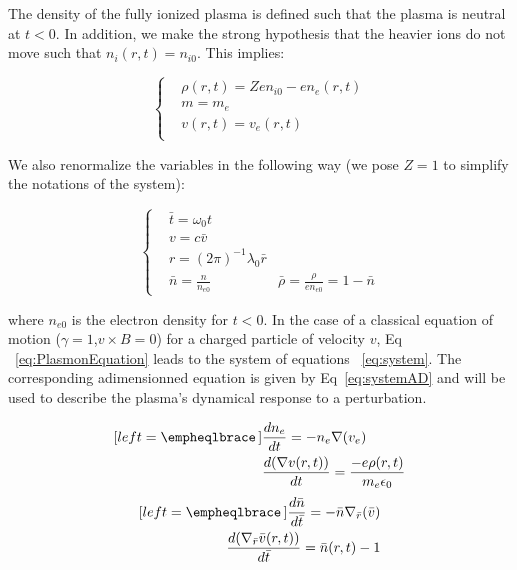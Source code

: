 \noindent The density of the fully ionized plasma is defined such that the plasma is neutral at $t < 0$. In addition, we make the strong hypothesis that the heavier ions do not move such that $n_i(r,t) = n_{i0}$. This implies:


\begin{equation}
  \left\{
      \begin{aligned}
     &\rho(r,t) = Z e n_{i0} - e  n_e(r,t)\\
     &m = m_e\\
    &v(r,t) = v_e(r,t)\\
      \end{aligned}
    \right.
\label{eq:Parameters}
\end{equation}

\noindent We also renormalize the variables in the following way (we pose $Z=1$ to simplify the notations of the system):

\begin{equation}
  \left\{
      \begin{aligned}
     &\bar{t} = \omega_0 t\\
     &v = c \bar{v}\\
     &r = (2\pi)^{-1} \lambda_0 \bar{r}\\  
     & \bar{n} = \frac{n}{n_{e0}} 
     & \bar{\rho} = \frac{\rho}{e n_{e0}} = 1 - \bar{n}
      \end{aligned}
    \right.
\end{equation}

\noindent where $n_{e0}$ is the electron density for $t<0$.
In the case of a classical equation of motion ($\gamma = 1$,$v\times B = 0$) for a charged particle of velocity $v$, Eq ~\ref{eq:PlasmonEquation} leads to the system of equations 
~\ref{eq:system}. The corresponding adimensionned equation is given by Eq~\ref{eq:systemAD} and will be used to describe the plasma's dynamical response to a perturbation.



\begin{multicols}{2}

\begin{subequations}
\label{eq:system}
\begin{align}[left = \empheqlbrace\,]
  &\frac{d n_e}{dt} = - n_e\nabla(v_e)  \label{eq:system1}\\
  &\frac{d( \nabla v(r,t))}{dt} = \frac{-e \rho(r,t)}{m_e \epsilon_0} \label{eq:system2}
\end{align}
\end{subequations}
\begin{subequations}
\label{eq:systemAD}
\begin{align}[left = \empheqlbrace\,]
   \frac{d \bar{n}}{d\bar{t}} = - \bar{n}\nabla_{\bar{r}}(\bar{v})   \label{eq:systemAD1}\\
   \frac{d( \nabla_{\bar{r}} \bar{v}(r,t))}{d\bar{t}} =  \bar{n}(r,t)-1 \label{eq:systemAD2}
\end{align}
\end{subequations}
\end{multicols}






